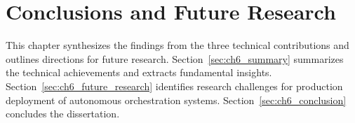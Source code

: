 \chapter{Conclusions and Future Research}
\label{ch:conclusions}

This chapter synthesizes the findings from the three technical contributions and outlines directions for future research. Section~\ref{sec:ch6_summary} summarizes the technical achievements and extracts fundamental insights. Section~\ref{sec:ch6_future_research} identifies research challenges for production deployment of autonomous orchestration systems. Section~\ref{sec:ch6_conclusion} concludes the dissertation.




